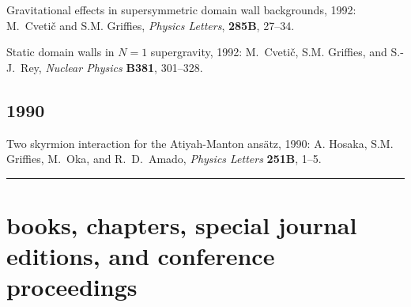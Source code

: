 \begin{etaremune}
\item Gravitational effects in supersymmetric domain wall backgrounds, 1992: M.\ Cveti\v c and S.M. Grif\/f\/ies, {\em Physics Letters}, {\bf 285B}, 27--34.

\item Static domain walls in $N=1$ supergravity, 1992: M.\ Cveti\v c, S.M. Grif\/f\/ies, and S.-J.\ Rey, {\em Nuclear Physics} {\bf B381}, 301--328.

\subsection*{\sc \color{Maroon} 1990}

\item Two skyrmion interaction for the Atiyah-Manton ans\"atz, 1990:  A. Hosaka, S.M. Grif\/f\/ies, M.\ Oka, and R.\ D.\ Amado, {\it Physics Letters} {\bf 251B}, 1--5.


\end{etaremune}

\noindent\rule{\textwidth}{1pt}
\vspace{-1cm}
\section*{\sc \color{Maroon} books, chapters, special journal editions, and conference proceedings}


